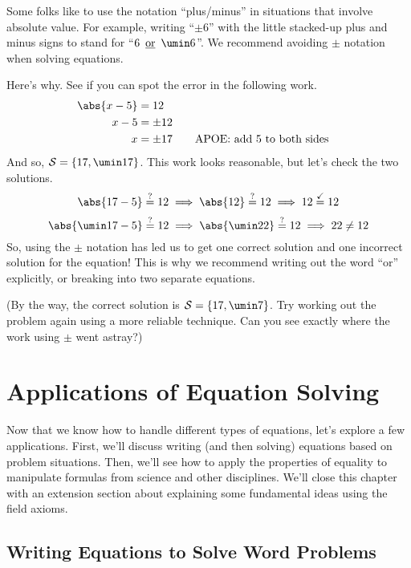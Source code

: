 \begin{boxedwarning}
Some folks like to use the notation ``plus/minus'' in situations that involve absolute value. For example, writing ``$\pm6$'' with the little stacked-up plus and minus signs to stand for ``$6 \OR \umin6$''. We recommend avoiding $\pm$ notation when solving equations.

Here's why. See if you can spot the error in the following work.
\[\begin{aligned}
\abs{x - 5} &= 12\\
x-5 &= \pm12\\
x &= \pm17
&& \text{\quad APOE: add 5 to both sides}\\
\end{aligned}\]
And so, $\solset{17, \umin17}$. This work looks reasonable, but let's check the two solutions.
\[\abs{17 - 5} \overset{?}{=} 12 \implies \abs{12} \overset{?}{=} 12 \implies 12 \overset{\checkmark}{=} 12\]
\[\abs{\umin17 - 5} \overset{?}{=} 12 \implies \abs{\umin22} \overset{?}{=} 12 \implies 22 \neq 12\]
So, using the $\pm$ notation has led us to get one correct solution and one incorrect solution for the equation! This is why we recommend writing out the word ``or'' explicitly, or breaking into two separate equations.

(By the way, the correct solution is $\solset{17, \umin7}$. Try working out the problem again using a more reliable technique. Can you see exactly where the work using $\pm$ went astray?)
\end{boxedwarning}

\section{Applications of Equation Solving}
\label{sec:eqsolveapplications}

Now that we know how to handle different types of equations, let's explore a few applications. First, we'll discuss writing (and then solving) equations based on problem situations. Then, we'll see how to apply the properties of equality to manipulate formulas from science and other disciplines. We'll close this chapter with an extension section about explaining some fundamental ideas using the field axioms.

\subsection{Writing Equations to Solve Word Problems}

